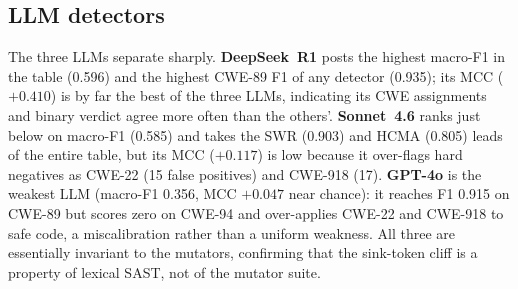 \documentclass[conference]{IEEEtran}
\begin{document}
\begin{table}[t]
\caption{Robustness drop (clean $-$ mutator) by family. Sink-preserve is
the mean of the four sink-preserving mutators; SAO, SVG, and TTD are
individual. $\Delta$SWR is the drop in severity-weighted recall.}
\label{tab:drop}
\centering
\setlength{\tabcolsep}{3.0pt}
\end{table}

\subsection{LLM detectors}
The three LLMs separate sharply. \textbf{DeepSeek~R1} posts the highest
macro-F1 in the table (0.596) and the highest CWE-89 F1 of any detector
(0.935); its MCC ($+0.410$) is by far the best of the three LLMs,
indicating its CWE assignments and binary verdict agree more often than
the others'. \textbf{Sonnet~4.6} ranks just below on macro-F1 (0.585)
and takes the SWR (0.903) and HCMA (0.805) leads of the entire table,
but its MCC ($+0.117$) is low because it over-flags hard negatives as
CWE-22 (15 false positives) and CWE-918 (17). \textbf{GPT-4o} is the
weakest LLM (macro-F1 0.356, MCC $+0.047$ near chance): it reaches F1
0.915 on CWE-89 but scores zero on CWE-94 and over-applies CWE-22 and
CWE-918 to safe code, a miscalibration rather than a uniform weakness.
All three are essentially invariant to the mutators, confirming that the
sink-token cliff is a property of lexical SAST, not of the mutator suite.
\end{document}
